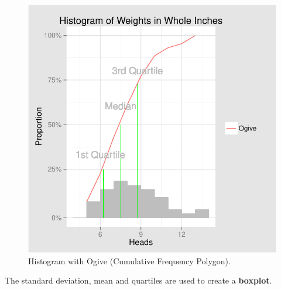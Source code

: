 \documentclass[nohyper,justified]{tufte-handout}\usepackage[]{graphicx}\usepackage[]{color}
\makeatletter
\def\maxwidth{ %
  \ifdim\Gin@nat@width>\linewidth
    \linewidth
  \else
    \Gin@nat@width
  \fi
}
\newenvironment{knitrout}{}{} %
\makeatother
\begin{document}
\begin{knitrout}
\color{fgcolor}\begin{figure}[h!]

{\centering \includegraphics[width=\maxwidth]{figure/graphics-ogive-1} 

}

\caption[Histogram with Ogive (Cumulative Frequency Polygon)]{Histogram with Ogive (Cumulative Frequency Polygon).}\label{fig:ogive}
\end{figure}


\end{knitrout}

The standard deviation, mean and quartiles are used to create a \textbf{boxplot}.
\end{document}
